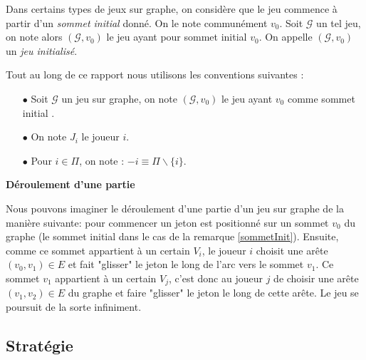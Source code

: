 \begin{rem}\label{sommetInit}
	Dans certains types de jeux sur graphe, on considère que le jeu commence à partir d'un \textit{sommet initial} donné. On le note communément $v_{0}$. Soit $\mathcal{G}$ un tel jeu, on note alors $(\mathcal{G},v_{0})$ le jeu ayant pour sommet initial $v_{0}$. On appelle $(\mathcal{G},v_{0})$ un \textit{jeu initialisé}.
\end{rem}

\begin{notations}
	Tout au long de ce rapport nous utilisons les conventions suivantes :
	\begin{enumerate}
		\item[$\bullet$] Soit $\mathcal{G}$ un jeu sur graphe, on note $(\mathcal{G},v_{0})$ le jeu ayant $v_{0}$ comme sommet initial .
		
		\item[$\bullet$] On note $J_{i}$  le joueur $i$.
		
		\item[$\bullet$] Pour $i\in \Pi$, on note : $-i\equiv \Pi\backslash \{ i\} $.
	\end{enumerate}
\end{notations}



\noindent\textbf{Déroulement d'une partie}\label{derPar}

Nous pouvons imaginer le déroulement d'une partie d'un jeu sur graphe de la manière suivante: pour commencer un jeton est positionné sur un sommet $v_{0}$ du graphe (le sommet initial dans le cas de la remarque \ref{sommetInit}). Ensuite, comme ce sommet appartient à un certain $V_{i}$, le joueur $i$ choisit une arête $(v_{0},v_{1}) \in E$ et fait "glisser" le jeton le long de l'arc vers le sommet $v_{1}$. Ce sommet $v_{1}$ appartient à un certain $V_{j}$, c'est donc au joueur $j$ de choisir une arête $(v_{1},v_{2})\in E$ du graphe et faire "glisser" le jeton le long de cette arête. Le jeu se poursuit de la sorte infiniment. \\


\subsection{Stratégie}




